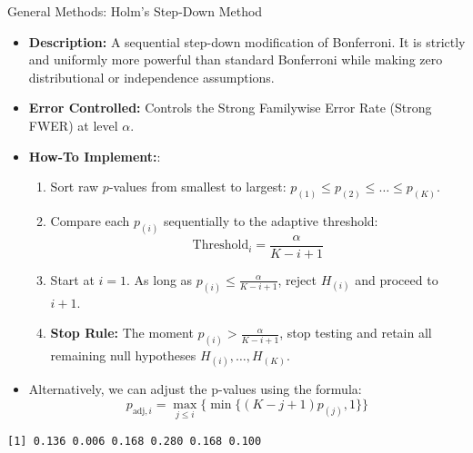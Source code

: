\begin{frame}{General Methods: Holm's Step-Down Method}
  \begin{itemize}
    \item \textbf{Description:} A sequential step-down modification of Bonferroni. It is strictly and uniformly more powerful than standard Bonferroni while making zero distributional or independence assumptions.
    \item \textbf{Error Controlled:} Controls the \alert{Strong Familywise Error Rate (Strong FWER)} at level $\alpha$.
    \item \textbf{How-To Implement:}:
    \begin{enumerate}
      \item Sort raw $p$-values from smallest to largest: $p_{(1)} \le p_{(2)} \le \dots \le p_{(K)}$.
      \item Compare each $p_{(i)}$ sequentially to the adaptive threshold:
      $$
      \text{Threshold}_i = \frac{\alpha}{K - i + 1}
      $$
      \item Start at $i = 1$. As long as $p_{(i)} \le \frac{\alpha}{K - i + 1}$, reject $H_{(i)}$ and proceed to $i + 1$.
      \item \textbf{Stop Rule:} The moment $p_{(i)} > \frac{\alpha}{K - i + 1}$, \alert{stop testing} and retain all remaining null hypotheses $H_{(i)}, \dots, H_{(K)}$.
    \end{enumerate}
    
    \item Alternatively, we can adjust the p-values using the formula:
    $$
    p_{\text{adj}, i} = \max_{j \leq i} \Big\{\min\big\{(K - j + 1)p_{(j)}, 1\big\}\Big\}
    $$
    
  \end{itemize}
  
  
\begin{knitrout}\small
{}\color{fgcolor}\begin{kframe}
\begin{alltt}
\hldef{(}
  \hldef{(}\hldef{,} \hldef{,} \hldef{,} \hldef{,} \hldef{,} \hldef{),}
   \hldef{=} 
\hldef{)}
\end{alltt}
\begin{verbatim}
[1] 0.136 0.006 0.168 0.280 0.168 0.100
\end{verbatim}
\end{kframe}
\end{knitrout}

\end{frame}


